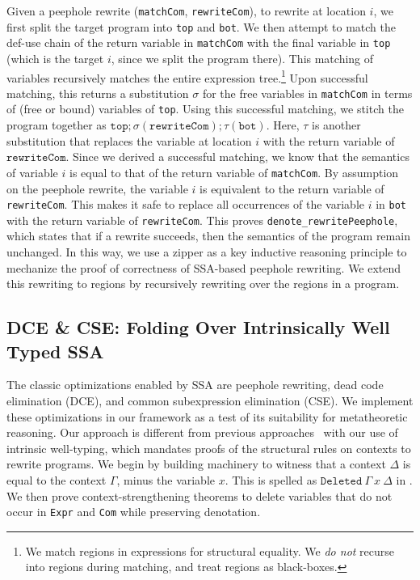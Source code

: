 Given a peephole rewrite (\texttt{matchCom}, \texttt{rewriteCom}), to rewrite at location $i$, we first split the target program into \texttt{top} and \texttt{bot}.
We then attempt to match the def-use chain of the return variable in \texttt{matchCom} with the final variable in \texttt{top} (which is the target $i$, since we split the program there).
This matching of variables recursively matches the entire expression tree.\footnote{We match regions in expressions for structural equality. We \emph{do not} recurse into regions during matching, and treat regions as black-boxes.}
Upon successful matching, this returns a substitution $\sigma$ for the free variables in \texttt{matchCom} in terms of (free or bound) variables of \texttt{top}.
Using this successful matching, we stitch the program together as $\texttt{top}; \sigma(\texttt{rewriteCom}); \tau(\texttt{bot})$.
Here, $\tau$ is another substitution that replaces the variable at location $i$ with the return variable of $\texttt{rewriteCom}$.
Since we derived a successful matching, we know that the semantics of variable $i$ is equal to that of the return variable of \texttt{matchCom}.
By assumption on the peephole rewrite, the variable $i$ is equivalent to the return variable of \texttt{rewriteCom}.
This makes it safe to replace all occurrences of the variable $i$ in \texttt{bot} with the return variable of \texttt{rewriteCom}.
This proves \texttt{denote\_rewritePeephole}, which states that if a rewrite succeeds, then the semantics of the program remain unchanged.
In this way, we use a zipper as a key inductive reasoning principle to mechanize the proof of correctness of SSA-based peephole rewriting. We extend this rewriting to regions by recursively rewriting over the regions in a program.

\subsection{DCE \& CSE: Folding Over Intrinsically Well Typed SSA}
\label{sec:mlir:dce}

The classic optimizations enabled by SSA are peephole rewriting, dead code elimination (DCE), and common subexpression elimination (CSE).
We implement these optimizations in our framework as a test of its suitability for metatheoretic reasoning.
Our approach is different from previous approaches~\cite{zhao2013formal, barthe2014formal} with our use of intrinsic well-typing,
which mandates proofs of the structural rules on contexts to rewrite programs.
We begin by building machinery to witness that a context $\Delta$ is equal to the context $\Gamma$, minus the variable $x$. This is spelled as $\texttt{Deleted}~\Gamma~x~\Delta$ in .
We then prove context-strengthening theorems to delete variables that do not occur in \texttt{Expr} and \texttt{Com} while preserving denotation.

